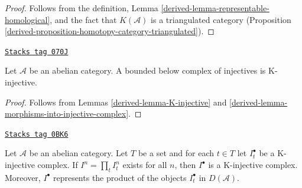 \begin{proof}

Follows from the definition,
Lemma \ref{derived-lemma-representable-homological}, and
the fact that $K(\mathcal{A})$ is a triangulated category
(Proposition \ref{derived-proposition-homotopy-category-triangulated}).
\end{proof}

\begin{lemma}
\label{derived-lemma-bounded-below-injectives-K-injective}
\href{https://stacks.math.columbia.edu/tag/070J}{\texttt{Stacks tag 070J}}

Let $\mathcal{A}$ be an abelian category. A bounded below complex of
injectives is K-injective.
\end{lemma}

\begin{proof}

Follows from
Lemmas \ref{derived-lemma-K-injective} and
\ref{derived-lemma-morphisms-into-injective-complex}.
\end{proof}

\begin{lemma}
\label{derived-lemma-product-K-injective}
\href{https://stacks.math.columbia.edu/tag/0BK6}{\texttt{Stacks tag 0BK6}}

Let $\mathcal{A}$ be an abelian category. Let $T$ be a set and for
each $t \in T$ let $I_t^\bullet$ be a K-injective complex. If
$I^n = \prod_t I_t^n$ exists for all $n$, then $I^\bullet$ is
a K-injective complex. Moreover, $I^\bullet$ represents the
product of the objects $I_t^\bullet$ in $D(\mathcal{A})$.
\end{lemma}

